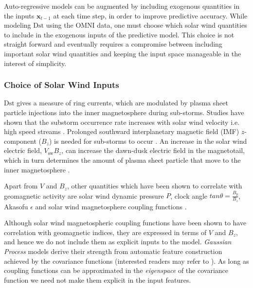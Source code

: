 Auto-regressive models can be augmented by including exogenous quantities in the inputs 
$\mathbf{x}_{t-1}$ at each time step, in order to improve predictive accuracy. While modeling 
$\mathrm{Dst}$ using the OMNI data, one must choose which solar wind quantities to include in the 
exogenous inputs of the predictive model. This choice is not straight forward and eventually 
requires a compromise between including important solar wind quantities and keeping the input 
space manageable in the interest of simplicity.

\subsubsection{Choice of Solar Wind Inputs}

$ \mathrm{Dst}$ gives a measure of ring currents, which are modulated by plasma sheet particle 
injections into the inner magnetosphere during sub-storms. Studies have shown that the substorm 
occurrence rate increases with solar wind velocity i.e. high speed streams 
\citep{Kissinger2011,Newell2016}. Prolonged southward interplanetary magnetic field (IMF) 
$z$-component ($B_z$) is needed for sub-storms to occur \citep{McPherron1986}. An increase in the 
solar wind electric field, $V_{\text{sw}}B_z$, can increase the dawn-dusk electric field in the 
magnetotail, which in turn determines the amount of plasma sheet particle that move to the inner 
magnetosphere \citep{Friedel2001}. 

Apart from $V$ and $B_z$, other quantities which have been shown to correlate with geomagnetic 
activity are solar wind dynamic pressure $P$, clock angle $tan \theta = \frac{B_y}{B_z}$, Akasofu 
$\epsilon$ \citep{1986AkasofuE} and solar wind magnetosphere coupling functions 
\citep{JGRA:JGRA21451}. 

Although solar wind magnetospheric coupling functions have been shown to have correlation with 
geomagnetic indices, they are expressed in terms of $V$ and $B_z$, and hence we do not include them 
as explicit inputs to the model. \emph{Gaussian Process} models derive their strength from 
automatic feature construction achieved by the covariance functions (interested readers may refer 
to \citet[ch.~6 \& 7]{Rasmussen:2005:GPM:1162254}). As long as coupling functions can be 
approximated in the \emph{eigenspace} of the covariance function we need not make them explicit in 
the input features. 

